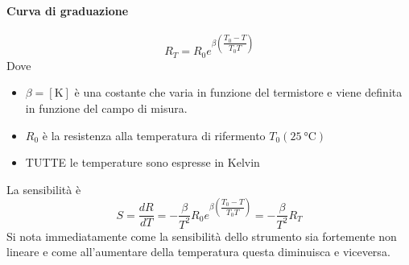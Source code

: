 \documentclass[a4paper, 15pt]{article}
\begin{document}
\begin{adjustwidth}{2in}{}
	\paragraph{Curva di graduazione} 
	\[R_T = R_0e^{\beta\left(\dfrac{T_0-T}{T_0T}\right)}\]
	Dove 
	\begin{itemize}
		\item \(\beta = [\unit{\kelvin}]\) è una costante che varia in funzione del termistore e viene definita in funzione del campo di misura.
		\item $R_0$ è la resistenza alla temperatura di rifermento $T_0(\SI{25}{\celsius})$
		\item TUTTE le temperature sono espresse in Kelvin
	\end{itemize}
	La sensibilità è
	\[S = \dfrac{dR}{dT} = -\dfrac{\beta}{T^2}R_0e^{\beta\left(\dfrac{T_0-T}{T_0T}\right)}= - \dfrac{\beta}{T^2}R_T\]
	Si nota immediatamente come la sensibilità dello strumento sia fortemente non lineare e come all'aumentare della temperatura questa diminuisca e viceversa.
	

\end{adjustwidth}
\end{document}
